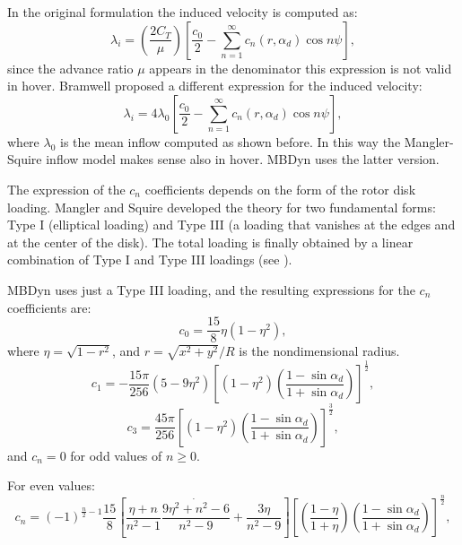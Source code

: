 In the original formulation the induced velocity is computed as:
\begin{equation}
\lambda_i = \left( \frac{ 2 C_T}{\mu} \right) \left[ 
\frac{c_0}{2} - \sum_{n=1}^{\infty} c_n(r,\alpha_d) \cos{n \psi} \right],
\end{equation}
since the advance ratio $\mu$ appears in the denominator this expression is
not valid in hover.
Bramwell \cite{BRAMWELL-1976} proposed a different expression for the induced 
velocity:
\begin{equation}
\lambda_i = 4 \lambda_0 \left[ 
\frac{c_0}{2} - \sum_{n=1}^{\infty} c_n(r,\alpha_d) \cos{n \psi} \right],
\end{equation}
where $\lambda_0$ is the mean inflow computed as shown before. In this way
the Mangler-Squire inflow model makes sense also in hover. MBDyn uses the latter
version.

The expression of the $c_n$ coefficients depends on the form of the 
rotor disk loading. Mangler and Squire developed the theory for two fundamental
forms: Type I (elliptical loading) and Type III (a loading that vanishes at the 
edges and at the center of the disk). The total loading is finally obtained by
a linear combination of Type I and Type III loadings (see \cite{LEISHMAN-2006}).

MBDyn uses just a Type III loading, and the resulting expressions for the
$c_n$ coefficients are:
\begin{equation}
c_0 = \frac{15}{8} \eta \left( 1-\eta^2 \right),
\end{equation}
where $\eta = \sqrt{ 1 - r^2}$,
and $r=\sqrt{x^2 + y^2}/R$ is the nondimensional radius.
\begin{equation}
c_1 = -\frac{ 15 \pi}{256} 
\left( 5 - 9 \eta^2 \right)
\left[ 
\left(1-\eta^2\right)
\left( \frac{1 - \sin{\alpha_d}}{1 + \sin{\alpha_d}} \right)
\right]^{\frac{1}{2}},
\end{equation}
\begin{equation}
c_3 = \frac{ 45 \pi}{256} 
\left[ 
\left(1-\eta^2\right)
\left( \frac{1 - \sin{\alpha_d}}{1 + \sin{\alpha_d}} \right)
\right]^{\frac{3}{2}},
\end{equation}
and $c_n = 0$ for odd values of $n \ge 0$.

For even values:
\begin{equation}
c_n = (-1)^{\frac{n}{2}-1} 
\frac{15}{8}
\left[ 
{\frac{\eta + n}{n^2 -1}} \dot {\frac{9 \eta^2 + n^2 -6}{n^2 -9}} + 
{\frac{ 3 \eta}{n^2 -9}} 
\right]
\left[ 
\left( \frac{1 - \eta}{1 + \eta} \right)
\left( \frac{1 - \sin{\alpha_d}}{1 + \sin{\alpha_d}} \right)
\right]^{\frac{n}{2}},
\end{equation}

